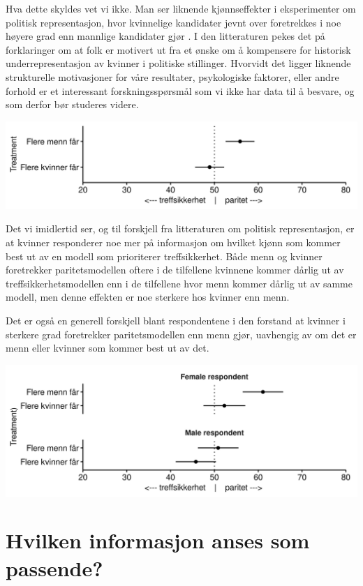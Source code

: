\documentclass[
]{book}
\begin{document}
Hva dette skyldes vet vi ikke.
Man ser liknende kjønnseffekter i eksperimenter om politisk representasjon, hvor kvinnelige kandidater jevnt over foretrekkes i noe høyere grad enn mannlige kandidater gjør \citep{schwarz2018have}.
I den litteraturen pekes det på forklaringer om at folk er motivert ut fra et ønske om å kompensere for historisk underrepresentasjon av kvinner i politiske stillinger.
Hvorvidt det ligger liknende strukturelle motivasjoner for våre resultater, psykologiske faktorer, eller andre forhold er et interessant forskningsspørsmål som vi ikke har data til å besvare, og som derfor bør studeres videre.

\includegraphics{figs/png/fig_parity_treat_avg.png}

Det vi imidlertid ser, og til forskjell fra litteraturen om politisk representasjon, er at kvinner responderer noe mer på informasjon om hvilket kjønn som kommer best ut av en modell som prioriterer treffsikkerhet.
Både menn og kvinner foretrekker paritetsmodellen oftere i de tilfellene kvinnene kommer dårlig ut av treffsikkerhetsmodellen enn i de tilfellene hvor menn kommer dårlig ut av samme modell, men denne effekten er noe sterkere hos kvinner enn menn.

Det er også en generell forskjell blant respondentene i den forstand at kvinner i sterkere grad foretrekker paritetsmodellen enn menn gjør, uavhengig av om det er menn eller kvinner som kommer best ut av det.

\includegraphics{figs/png/fig_parity_treat_avg_by_gender.png}

\hypertarget{input}{%
\chapter{Hvilken informasjon anses som passende?}\label{input}}
\end{document}

